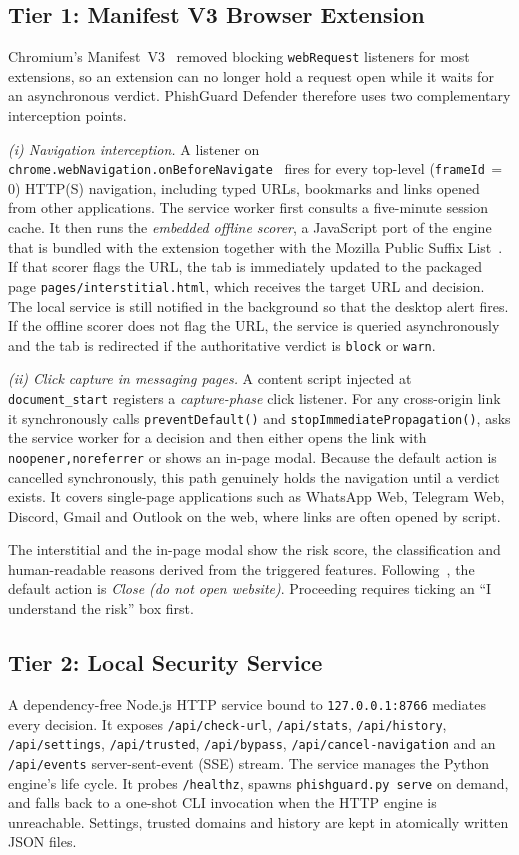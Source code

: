 \documentclass[conference]{IEEEtran}
\newcommand{\sys}{PhishGuard Defender}
\newcommand{\code}[1]{\texttt{\small #1}}
\begin{document}
\subsection{Tier 1: Manifest V3 Browser Extension}
\label{sec:ext}
Chromium's Manifest~V3~\cite{mv3} removed blocking \code{webRequest}
listeners for most extensions, so an extension can no longer hold a request
open while it waits for an asynchronous verdict. \sys{} therefore uses two
complementary interception points.

\emph{(i) Navigation interception.} A listener on
\code{chrome.webNavigation.onBeforeNavigate}~\cite{webnav} fires for every
top-level (\code{frameId}\,$=$\,0) HTTP(S) navigation, including typed URLs,
bookmarks and links opened from other applications. The service worker first
consults a five-minute session cache. It then runs the \emph{embedded offline
scorer}, a JavaScript port of the engine that is bundled with the extension
together with the Mozilla Public Suffix List~\cite{psl}. If that scorer flags
the URL, the tab is immediately updated to the packaged page
\code{pages/interstitial.html}, which receives the target URL and decision.
The local service is still notified in the background so that the desktop
alert fires. If the offline scorer does not flag the URL, the service is
queried asynchronously and the tab is redirected if the authoritative verdict
is \code{block} or \code{warn}.

\emph{(ii) Click capture in messaging pages.} A content script injected at
\code{document\_start} registers a \emph{capture-phase} click listener. For
any cross-origin link it synchronously calls \code{preventDefault()} and
\code{stopImmediatePropagation()}, asks the service worker for a decision and
then either opens the link with \code{noopener,noreferrer} or shows an in-page
modal. Because the default action is cancelled synchronously, this path
genuinely holds the navigation until a verdict exists. It covers single-page
applications such as WhatsApp Web, Telegram Web, Discord, Gmail and Outlook
on the web, where links are often opened by script.

The interstitial and the in-page modal show the risk score, the
classification and human-readable reasons derived from the triggered
features. Following~\cite{egelman2008,akhawe2013}, the default action is
\emph{Close (do not open website)}. Proceeding requires ticking an ``I
understand the risk'' box first.

\subsection{Tier 2: Local Security Service}
A dependency-free Node.js HTTP service bound to \code{127.0.0.1:8766}
mediates every decision. It exposes \code{/api/check-url}, \code{/api/stats},
\code{/api/history}, \code{/api/settings}, \code{/api/trusted},
\code{/api/bypass}, \code{/api/cancel-navigation} and an \code{/api/events}
server-sent-event (SSE) stream. The service manages the Python engine's
life cycle. It probes \code{/healthz}, spawns \code{phishguard.py serve} on
demand, and falls back to a one-shot CLI invocation when the HTTP engine is
unreachable. Settings, trusted domains and history are kept in atomically
written JSON files.
\end{document}
